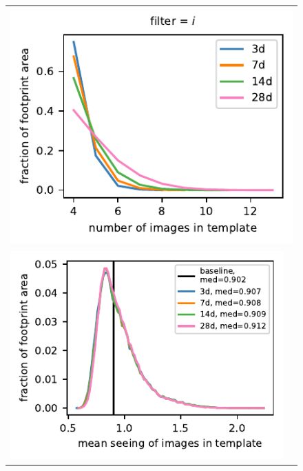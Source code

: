 \documentclass[preprintm,linenumbers]{aastex631}
\begin{document}
    \begin{figure}[h]
			\centering
%				
%				
			\begin{tabular}{@{}c@{}c@{}}
			\multicolumn{2}{c}{\includegraphics{results/histograms_templates_tscale/hist_first_year_one_snap_v4_0_10yrs_db_noDD_noTwi_doALLTemplateMetrics_reduceNTemplate_i_noDD_noTwi.pdf}} \\
					\includegraphics{results/histograms_templates_tscale/hist_first_year_one_snap_v4_0_10yrs_db_noDD_noTwi_doALLTemplateMetrics_reduceSeeingTemplate_i_noDD_noTwi.pdf} &

\end{tabular}
\end{figure}
\end{document}
